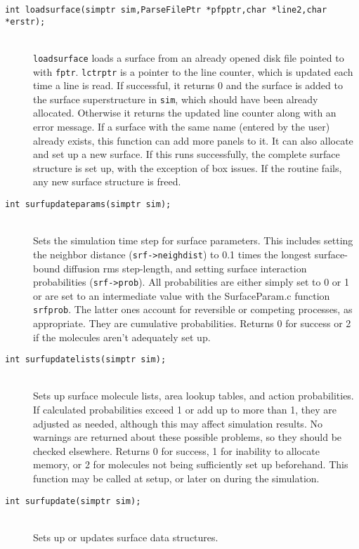 \documentclass {book}
\begin{document}
\begin{description}
\item[\texttt{int loadsurface(simptr sim,ParseFilePtr *pfpptr,char *line2,char *erstr);}]
\hfill \\
\texttt{loadsurface} loads a surface from an already opened disk file pointed to with \texttt{fptr}. \texttt{lctrptr} is a pointer to the line counter, which is updated each time a line is read. If successful, it returns 0 and the surface is added to the surface superstructure in \texttt{sim}, which should have been already allocated. Otherwise it returns the updated line counter along with an error message. If a surface with the same name (entered by the user) already exists, this function can add more panels to it. It can also allocate and set up a new surface. If this runs successfully, the complete surface structure is set up, with the exception of box issues. If the routine fails, any new surface structure is freed.

\item[\texttt{int surfupdateparams(simptr sim);}]
\hfill \\
Sets the simulation time step for surface parameters. This includes setting the neighbor distance (\texttt{srf->neighdist}) to 0.1 times the longest surface-bound diffusion rms step-length, and setting surface interaction probabilities (\texttt{srf->prob}). All probabilities are either simply set to 0 or 1 or are set to an intermediate value with the SurfaceParam.c function \texttt{srfprob}. The latter ones account for reversible or competing processes, as appropriate. They are cumulative probabilities. Returns 0 for success or 2 if the molecules aren't adequately set up.

\item[\texttt{int surfupdatelists(simptr sim);}]
\hfill \\
Sets up surface molecule lists, area lookup tables, and action probabilities. If calculated probabilities exceed 1 or add up to more than 1, they are adjusted as needed, although this may affect simulation results. No warnings are returned about these possible problems, so they should be checked elsewhere. Returns 0 for success, 1 for inability to allocate memory, or 2 for molecules not being sufficiently set up beforehand. This function may be called at setup, or later on during the simulation.

\item[\texttt{int surfupdate(simptr sim);}]
\hfill \\
Sets up or updates surface data structures.


\end{description}
\end{document}
